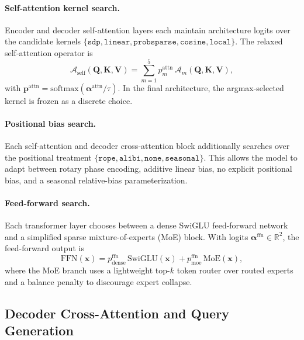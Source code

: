 \paragraph{Self-attention kernel search.}
Encoder and decoder self-attention layers each maintain architecture logits
over the candidate kernels
$\{\texttt{sdp},\texttt{linear},\texttt{probsparse},\texttt{cosine},
\texttt{local}\}$. The relaxed self-attention operator is
%
\begin{equation}
    \mathcal{A}_{\mathrm{self}}(\mathbf{Q},\mathbf{K},\mathbf{V})
    = \sum_{m=1}^{5} p^{\mathrm{attn}}_m\,
      \mathcal{A}_m(\mathbf{Q},\mathbf{K},\mathbf{V}),
    \label{eq:selfattn_mix}
\end{equation}
%
with $\mathbf{p}^{\mathrm{attn}} =
\mathrm{softmax}(\boldsymbol{\alpha}^{\mathrm{attn}}/\tau)$. In the final
architecture, the argmax-selected kernel is frozen as a discrete choice.

\paragraph{Positional bias search.}
Each self-attention and decoder cross-attention block additionally searches
over the positional treatment
$\{\texttt{rope},\texttt{alibi},\texttt{none},\texttt{seasonal}\}$. This
allows the model to adapt between rotary phase encoding, additive linear bias,
no explicit positional bias, and a seasonal relative-bias parameterization.

\paragraph{Feed-forward search.}
Each transformer layer chooses between a dense SwiGLU feed-forward network and
a simplified sparse mixture-of-experts (MoE) block. With logits
$\boldsymbol{\alpha}^{\mathrm{ffn}} \in \mathbb{R}^{2}$, the feed-forward
output is
%
\begin{equation}
    \mathrm{FFN}(\mathbf{x}) =
      p^{\mathrm{ffn}}_{\mathrm{dense}}\,\mathrm{SwiGLU}(\mathbf{x}) +
      p^{\mathrm{ffn}}_{\mathrm{moe}}\,\mathrm{MoE}(\mathbf{x}),
    \label{eq:ffn_mix}
\end{equation}
%
where the MoE branch uses a lightweight top-$k$ token router over routed
experts and a balance penalty to discourage expert collapse.

\subsection{Decoder Cross-Attention and Query Generation}
\label{sec:bridge}

